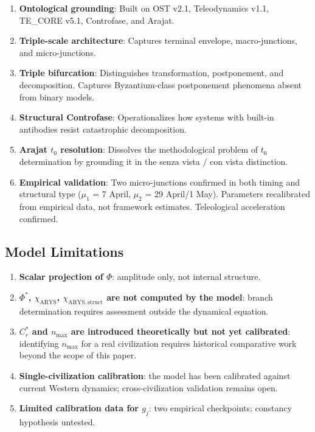 \documentclass[12pt,a4paper]{article}
\newcommand{\reagmeta}{C_r^{*}}
\newcommand{\gj}{g_j}
\newcommand{\Phistar}{\Phi^{*}}
\newcommand{\nmax}{n_{\mathrm{max}}}
\begin{document}
\begin{enumerate}[label=(\roman*)]
    \item \textbf{Ontological grounding}: Built on OST v2.1, Teleodynamics v1.1, TE\_CORE v5.1, Controfase, and Arajat.
    \item \textbf{Triple-scale architecture}: Captures terminal envelope, macro-junctions, and micro-junctions.
    \item \textbf{Triple bifurcation}: Distinguishes transformation, postponement, and decomposition. Captures Byzantium-class postponement phenomena absent from binary models.
    \item \textbf{Structural Controfase}: Operationalizes how systems with built-in antibodies resist catastrophic decomposition.
    \item \textbf{Arajat $t_0$ resolution}: Dissolves the methodological problem of $t_0$ determination by grounding it in the senza vista / con vista distinction.
    \item \textbf{Empirical validation}: Two micro-junctions confirmed in both timing and structural type ($\mu_1$ = 7 April, $\mu_2$ = 29 April/1 May). Parameters recalibrated from empirical data, not framework estimates. Teleological acceleration confirmed.
\end{enumerate}

\subsection{Model Limitations}

\begin{enumerate}[label=(\roman*)]
    \item \textbf{Scalar projection of $\Phi$}: amplitude only, not internal structure.
    \item \textbf{$\Phistar$, $\chi_{\mathrm{ARYS}}$, $\chi_{\mathrm{ARYS,struct}}$ are not computed by the model}: branch determination requires assessment outside the dynamical equation.
    \item \textbf{$\reagmeta$ and $\nmax$ are introduced theoretically but not yet calibrated}: identifying $\nmax$ for a real civilization requires historical comparative work beyond the scope of this paper.
    \item \textbf{Single-civilization calibration}: the model has been calibrated against current Western dynamics; cross-civilization validation remains open.
    \item \textbf{Limited calibration data for $\gj$}: two empirical checkpoints; constancy hypothesis untested.
\end{enumerate}
\end{document}
